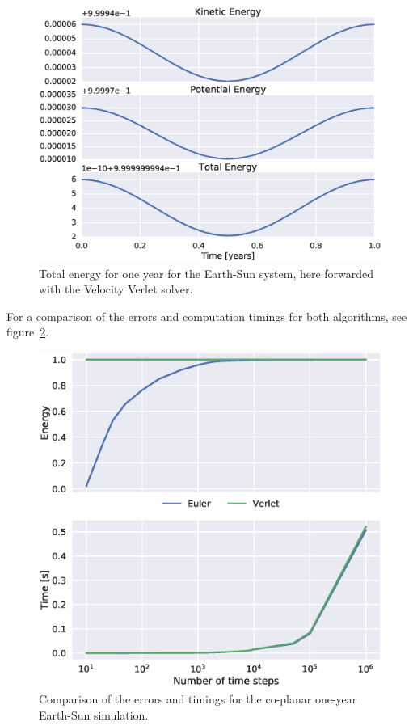 \documentclass[aps,reprint]{revtex4-1}
\begin{document}
\begin{figure}[H]
  \includegraphics[width=\columnwidth]{figures/energy_verlet.eps}
  \caption{Total energy for one year for the Earth-Sun system, here forwarded
  with the Velocity Verlet solver.}
  \label{fig:verletenergy}
\end{figure}

For a comparison of the errors and computation timings for both algorithms, see
figure~\ref{fig:timing}.

\begin{figure}[H]
  \includegraphics[width=\columnwidth]{figures/timing.eps}
  \caption{Comparison of the errors and timings for the co-planar one-year Earth-Sun
  simulation.}
  \label{fig:timing}
\end{figure}
\end{document}
